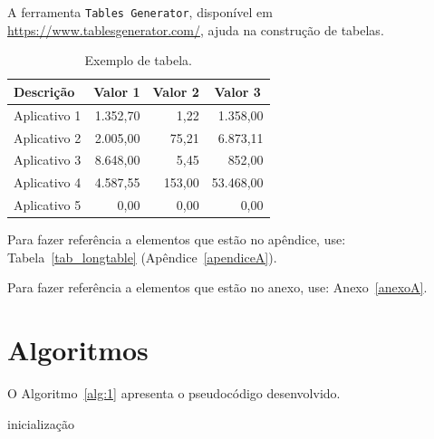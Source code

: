 A ferramenta \texttt{Tables Generator}, disponível em \url{https://www.tablesgenerator.com/}, ajuda na construção de tabelas.

\begin{table}[htb]
	\centering
	\caption{Exemplo de tabela.}
	\label{tab_shorttable}
	\begin{tabular}{lrrr}
		\toprule
		Descrição    & \multicolumn{1}{c}{Valor 1} & \multicolumn{1}{c}{Valor 2} & \multicolumn{1}{c}{Valor 3} \\
		\midrule
		Aplicativo 1 & 1.352,70 &   1,22 &  1.358,00 \\
		Aplicativo 2 & 2.005,00 &  75,21 &  6.873,11 \\
		Aplicativo 3 & 8.648,00 &   5,45 &    852,00 \\
		Aplicativo 4 & 4.587,55 & 153,00 & 53.468,00 \\
		Aplicativo 5 &     0,00 &   0,00 &      0,00 \\
		\bottomrule
	\end{tabular}
\end{table}

Para fazer referência a elementos que estão no apêndice, use: Tabela~\ref{tab_longtable} (Apêndice~\ref{apendiceA}).

Para fazer referência a elementos que estão no anexo, use: Anexo~\ref{anexoA}.

\section{Algoritmos}
\label{sec_algoritmos}

O Algoritmo~\ref{alg:1} apresenta o pseudocódigo desenvolvido.

\begin{algorithm}[H]
	\SetAlgoLined
	inicialização\;
	\caption{Como escrever algoritmos}
	\label{alg:1}
\end{algorithm}
